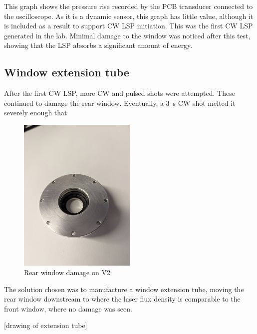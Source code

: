             This graph shows the pressure rise recorded by the PCB transducer connected to the oscilloscope. As it is a dynamic sensor, this graph has little value, although it is included as a result to support CW LSP initiation. This was the first CW LSP generated in the lab. Minimal damage to the window was noticed after this test, showing that the LSP absorbs a significant amount of energy.

        \subsection{Window extension tube}
            
            After the first CW LSP, more CW and pulsed shots were attempted. These continued to damage the rear window. Eventually, a \qty{3}{s} CW shot melted it severely enough that 

            \begin{figure}[!ht]
                \centering
                \includegraphics[width=0.5\textwidth]{assets/4 experiments/window damage.jpg}
                \caption{Rear window damage on V2}
            \end{figure}

            The solution chosen was to manufacture a window extension tube, moving the rear window downstream to where the laser flux density is comparable to the front window, where no damage was seen.

            [drawing of extension tube]


        



